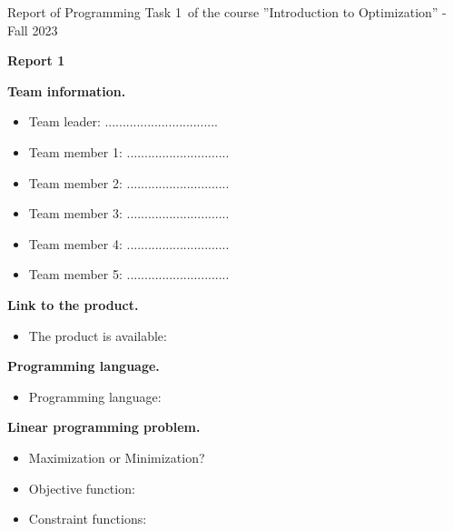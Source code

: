 \documentclass[12pt, legalpaper]{exam}
\newcommand{\course}{Introduction to Optimization}
\newcommand{\term}{Fall 2023}
\newcommand{\examnum}{Report of Programming Task 1}
\begin{document}
\noindent \examnum \, of the  course ''\course'' - \term


\noindent
{}




\vspace{12pt}
\begin{center}
    \textbf{Report 1}
\end{center}

\vspace{12pt}

\noindent  \textbf{Team information.}

\begin{itemize}
    \item Team leader: ................................
    \item Team member 1: .............................
    \item Team member 2: .............................
    \item Team member 3: .............................
    \item Team member 4: .............................
    \item Team member 5: .............................
\end{itemize}
\vspace{12pt}
\noindent     \textbf{Link to the product.}
\begin{itemize}
    \item The product is available:  
\end{itemize}

\vspace{12pt}

\noindent  \textbf{Programming language.}
\begin{itemize}
    \item Programming language: 
\end{itemize}

\vspace{12pt}

\noindent  \textbf{Linear programming problem.}
\begin{itemize}
\item Maximization or Minimization?
\vspace{10pt}
    \item Objective function:
    \vspace{10pt}
    \item Constraint functions:
    \vspace{5cm}
\end{itemize}
\end{document}
